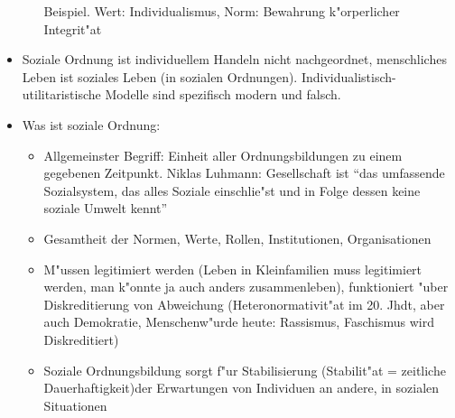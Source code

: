\begin{itemize}
\begin{itemize}
				Beispiel. Wert: Individualismus, Norm: Bewahrung k"orperlicher Integrit"at
		\end{itemize}
	\item
		Soziale Ordnung ist individuellem Handeln nicht nachgeordnet, menschliches Leben ist soziales Leben (in sozialen Ordnungen).
		Individualistisch-utilitaristische Modelle sind spezifisch modern und falsch.
	\item
		Was ist soziale Ordnung:
		\begin{itemize}
			\item
				Allgemeinster Begriff: Einheit aller Ordnungsbildungen zu einem gegebenen Zeitpunkt. Niklas Luhmann: Gesellschaft ist \enquote{das umfassende Sozialsystem, das alles Soziale einschlie"st und in Folge dessen keine soziale Umwelt kennt}
			\item
				Gesamtheit der Normen, Werte, Rollen, Institutionen, Organisationen
			\item
				M"ussen legitimiert werden (Leben in Kleinfamilien muss legitimiert werden, man k"onnte ja auch anders zusammenleben), funktioniert "uber Diskreditierung von Abweichung (Heteronormativit"at im 20. Jhdt, aber auch Demokratie, Menschenw"urde heute: Rassismus, Faschismus wird Diskreditiert)
			\item
				Soziale Ordnungsbildung sorgt f"ur Stabilisierung (Stabilit"at = zeitliche Dauerhaftigkeit)der Erwartungen von Individuen an andere, in sozialen Situationen
		\end{itemize}


\end{itemize}
